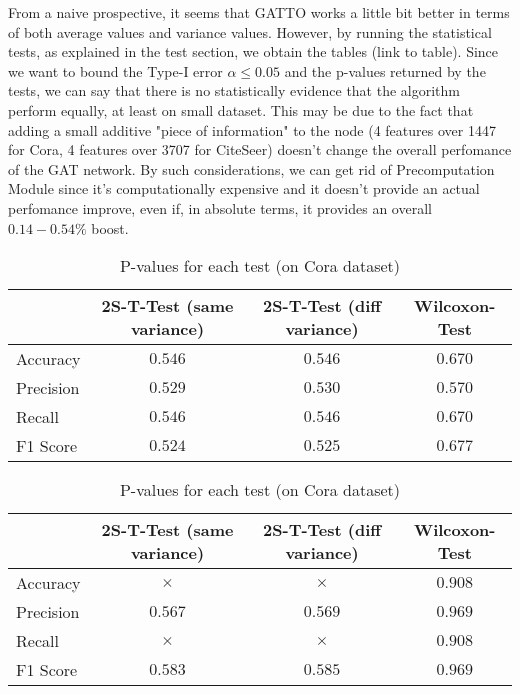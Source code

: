 \documentclass[12pt,conference]{ieeeconf} %
\begin{document}
From a naive prospective, it seems that GATTO works a little bit better in terms of both average values and variance values.
However, by running the statistical tests, as explained in the test section, we obtain the tables (link to table). Since we want to bound the Type-I error $\alpha \le 0.05$ and the p-values returned by the tests, we can say that there is no statistically evidence that the algorithm perform equally, at least on small dataset.
This may be due to the fact that adding a small additive "piece of information" to the node (4 features over 1447 for Cora, 4 features over 3707 for CiteSeer) doesn't change the overall perfomance of the GAT network. By such considerations, we can get rid of Precomputation Module since it's computationally expensive and it doesn't provide an actual perfomance improve, even if, in absolute terms, it provides an overall $0.14-0.54\%$ boost.
\begin{table*}[h!]
    \centering 
    \begin{tabular}{|l|c|c|c|} 
    \hline
     & 2S-T-Test (same variance) & 2S-T-Test (diff variance) & Wilcoxon-Test\\ \hline
    Accuracy &$0.546$ &$0.546$ &$0.670$ \\ \hline
    Precision &$0.529$ &$0.530$ &$0.570$\\ \hline
    Recall &$0.546$ &$0.546$ &$0.670$\\ \hline
    F1 Score &$0.524$ &$0.525$ &$0.677$\\ \hline
    \end{tabular}
    \caption{P-values for each test (on Cora dataset)}
\end{table*}

\begin{table*}[h!]
    \centering 
    \begin{tabular}{|l|c|c|c|} 
    \hline
     & 2S-T-Test (same variance) & 2S-T-Test (diff variance) & Wilcoxon-Test\\ \hline
    Accuracy &$\times$ &$\times$ &$0.908$ \\ \hline
    Precision &$0.567$ &$0.569$ &$0.969$\\ \hline
    Recall &$\times$ &$\times$ &$0.908$\\ \hline
    F1 Score &$0.583$ &$0.585$ &$0.969$\\ \hline
    \end{tabular}
    \caption{P-values for each test (on Cora dataset)}
\end{table*}


\vspace{\fill}
\printbibliography
\newpage
\end{document}
